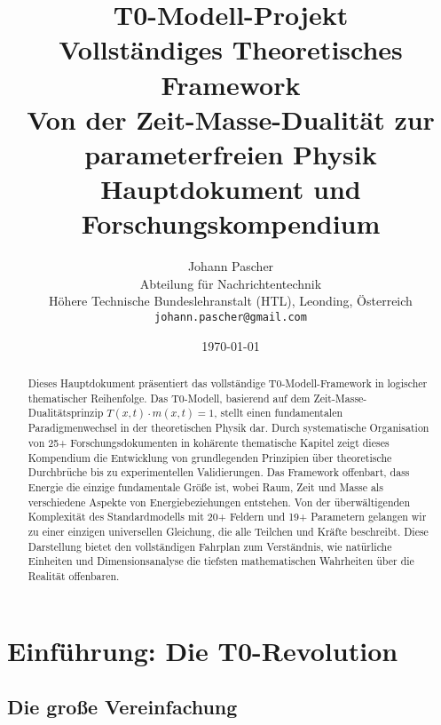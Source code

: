 \documentclass[12pt,a4paper]{report}
\begin{document}
	
	\title{{\Huge T0-Modell-Projekt}\\
		{\LARGE Vollständiges Theoretisches Framework}\\
		{\Large Von der Zeit-Masse-Dualität zur parameterfreien Physik}\\
		\vspace{1cm}
		{\large Hauptdokument und Forschungskompendium}}
	
	\author{{\Large Johann Pascher}\\
		Abteilung für Nachrichtentechnik\\
		Höhere Technische Bundeslehranstalt (HTL), Leonding, Österreich\\
		\texttt{johann.pascher@gmail.com}}
	
	\date{\today}
	
	\maketitle
	
	\begin{abstract}
		Dieses Hauptdokument präsentiert das vollständige T0-Modell-Framework in logischer thematischer Reihenfolge. Das T0-Modell, basierend auf dem Zeit-Masse-Dualitätsprinzip $T(x,t) \cdot m(x,t) = 1$, stellt einen fundamentalen Paradigmenwechsel in der theoretischen Physik dar. Durch systematische Organisation von 25+ Forschungsdokumenten in kohärente thematische Kapitel zeigt dieses Kompendium die Entwicklung von grundlegenden Prinzipien über theoretische Durchbrüche bis zu experimentellen Validierungen. Das Framework offenbart, dass Energie die einzige fundamentale Größe ist, wobei Raum, Zeit und Masse als verschiedene Aspekte von Energiebeziehungen entstehen. Von der überwältigenden Komplexität des Standardmodells mit 20+ Feldern und 19+ Parametern gelangen wir zu einer einzigen universellen Gleichung, die alle Teilchen und Kräfte beschreibt. Diese Darstellung bietet den vollständigen Fahrplan zum Verständnis, wie natürliche Einheiten und Dimensionsanalyse die tiefsten mathematischen Wahrheiten über die Realität offenbaren.
	\end{abstract}
	
	\tableofcontents
	\listoftables
	
	\chapter{Einführung: Die T0-Revolution}
	
	\section{Die große Vereinfachung}
	
\end{document}
